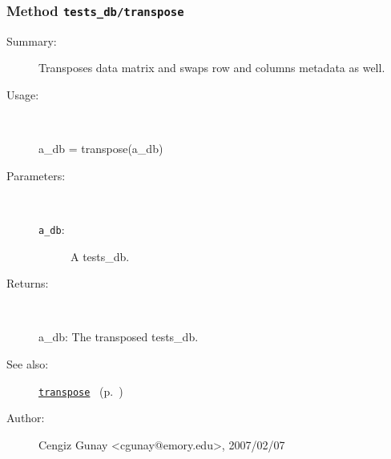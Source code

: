 \subsubsection[Method \texttt{transpose}]{Method \texttt{tests\_db/transpose}}%
%
\label{ref_tests_db__transpose}%
\hypertarget{ref_tests_db__transpose}{}%
\begin{description}
\item[Summary:]Transposes data matrix and swaps row and columns metadata as well.
%
\item[Usage:]~%
\begin{lyxcode}%
a\_db = transpose(a\_db)
%
\end{lyxcode}%
%
%
\item[Parameters:]~
\begin{description}%
\item[\texttt{a\_db}:]
 A tests\_db.
\end{description}%
%
\item[Returns:]~

	a\_db: The transposed tests\_db.
%
%
\item[See also:]%
\hyperlink{ref_transpose}{\texttt{transpose}}%
\ (p.~\pageref{ref_transpose})%
%
%
\item[Author:]%
Cengiz Gunay <cgunay@emory.edu>, 2007/02/07%
\end{description}
\methodline%
